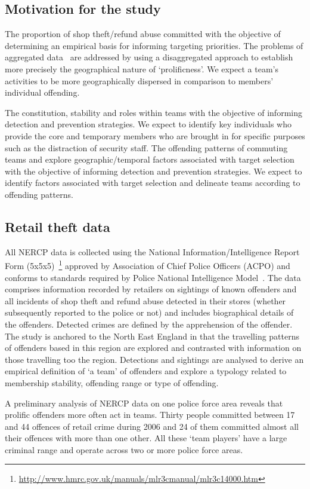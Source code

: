 \documentclass[conference]{IEEEtran}
\theoremstyle{definition}
\begin{document}
\subsection{Motivation for the study}
The proportion of shop theft/refund abuse committed with the objective
of determining an empirical basis for informing targeting
priorities. The problems of aggregated data~\cite{TownsleyPease2002}
are addressed by using a disaggregated approach to establish more
precisely the geographical nature of `prolificness'. We expect a
team’s activities to be more geographically dispersed in comparison to
members' individual offending.

The constitution, stability and roles within teams with the objective
of informing detection and prevention strategies.  We expect to
identify key individuals who provide the core and temporary members
who are brought in for specific purposes such as the distraction of
security staff. The offending patterns of commuting teams and explore
geographic/temporal factors associated with target selection with the
objective of informing detection and prevention strategies.  We expect
to identify factors associated with target selection and delineate
teams according to offending patterns. 

\subsection{Retail theft data}
All NERCP data is collected using the National
Information/Intelligence Report Form
(5x5x5)~\footnote{\url{http://www.hmrc.gov.uk/manuals/mlr3cmanual/mlr3c14000.htm}}
approved by Association of Chief Police Officers (ACPO) and conforms
to standards required by Police National Intelligence
Model~\cite{john+maguire:2004}. The data comprises information
recorded by retailers on sightings of known offenders and all
incidents of shop theft and refund abuse detected in their stores
(whether subsequently reported to the police or not) and includes
biographical details of the offenders.  Detected crimes are defined by
the apprehension of the offender. The study is anchored to the North
East England in that the travelling patterns of offenders based in
this region are explored and contrasted with information on those
travelling too the region. Detections and sightings are analysed to
derive an empirical definition of `a team' of offenders and explore a
typology related to membership stability, offending range or type of
offending.

A preliminary analysis of NERCP data on one police force area reveals
that prolific offenders more often act in teams. Thirty people
committed between 17 and 44 offences of retail crime during 2006 and
24 of them committed almost all their offences with more than one
other.  All these `team players' have a large criminal range and
operate across two or more police force areas.
 
\end{document}
